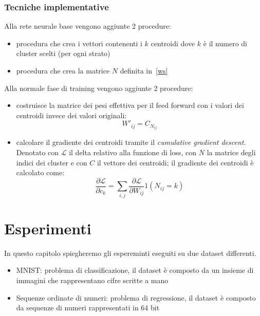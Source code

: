 \documentclass[11pt,a4paper,twoside,
openright]{book}
\begin{document}
\subsection{Tecniche implementative}
Alla rete neurale base vengono aggiunte 2 procedure:
\begin{itemize}
\item procedura che crea i vettori contenenti i $k$ centroidi dove $k$ è il numero di cluster scelti (per ogni strato)
\item procedura che crea la matrice $N$ definita in~\eqref{ws}
\end{itemize}
Alla normale fase di training vengono aggiunte 2 procedure:
\begin{itemize}
\item costruisce la matrice dei pesi effettiva per il feed forward con i valori dei centroidi invece dei valori originali:
\begin{equation}
W'_{ij} = C_{N_{ij}}
\label{wprimo}
\end{equation}
\item calcolare il gradiente dei centroidi tramite il \textit{cumulative gradient descent}. Denotato con $\mathcal{L}$ il delta relativo alla funzione di loss, con $N$ la matrice degli indici dei cluster e con $C$ il vettore dei centroidi; il gradiente dei centroidi è calcolato come:
\begin{equation}
\frac{\partial \mathcal{L}}{\partial c_{k}}=\sum\limits_{i,j}\frac{\partial \mathcal{L}}{\partial W_{ij}}1(N_{ij}=k)
\label{gradientews}
\end{equation}


\end{itemize}


\chapter{Esperimenti}
\label{esperimenti}
In questo capitolo spiegheremo gli espereminti eseguiti su due dataset differenti.
\begin{itemize}
\item MNIST: problema di classificazione, il dataset è composto da un insieme di immagini che rappresentano cifre scritte a mano
\item Sequenze ordinate di numeri: problema di regressione, il dataset è composto da sequenze di numeri rappresentati in 64 bit
\end{itemize}
\end{document}
